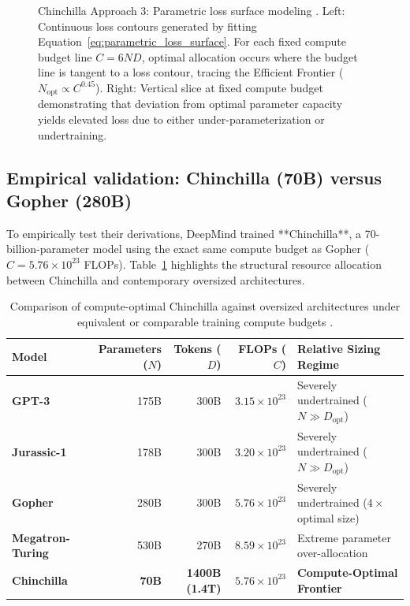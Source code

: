 \documentclass[../../../main.tex]{subfiles}
\begin{document}
\begin{figure}[htbp]
\caption{Chinchilla Approach 3: Parametric loss surface modeling \cite{hoffmann2022}. Left: Continuous loss contours generated by fitting Equation~\eqref{eq:parametric_loss_surface}. For each fixed compute budget line $C = 6ND$, optimal allocation occurs where the budget line is tangent to a loss contour, tracing the Efficient Frontier ($N_{\text{opt}} \propto C^{0.45}$). Right: Vertical slice at fixed compute budget demonstrating that deviation from optimal parameter capacity yields elevated loss due to either under-parameterization or undertraining.}
\label{fig:chinchilla_approach3}
\end{figure}


\subsection{Empirical validation: Chinchilla (70B) versus Gopher (280B)}
\label{subsec:chinchilla_validation}

To empirically test their derivations, DeepMind trained **Chinchilla**, a 70-billion-parameter model using the exact same compute budget as Gopher ($C = 5.76 \times 10^{23}$ FLOPs). Table~\ref{tab:chinchilla_vs_gopher} highlights the structural resource allocation between Chinchilla and contemporary oversized architectures.

\begin{table}[t]
\centering
\caption{Comparison of compute-optimal Chinchilla against oversized architectures under equivalent or comparable training compute budgets \cite{hoffmann2022}.}
\label{tab:chinchilla_vs_gopher}
\begin{tabularx}{\textwidth}{l r r r X}
\toprule
\textbf{Model} & \textbf{Parameters ($N$)} & \textbf{Tokens ($D$)} & \textbf{FLOPs ($C$)} & \textbf{Relative Sizing Regime} \\
\midrule
\textbf{GPT-3} & 175B & 300B & $3.15 \times 10^{23}$ & Severely undertrained ($N \gg D_{\text{opt}}$) \\
\textbf{Jurassic-1} & 178B & 300B & $3.20 \times 10^{23}$ & Severely undertrained ($N \gg D_{\text{opt}}$) \\
\textbf{Gopher} & 280B & 300B & $5.76 \times 10^{23}$ & Severely undertrained ($4\times$ optimal size) \\
\textbf{Megatron-Turing} & 530B & 270B & $8.59 \times 10^{23}$ & Extreme parameter over-allocation \\
\midrule
\textbf{Chinchilla} & \textbf{70B} & \textbf{1400B (1.4T)} & \textbf{$5.76 \times 10^{23}$} & \textbf{Compute-Optimal Frontier} \\
\bottomrule
\end{tabularx}
\end{table}
\end{document}
